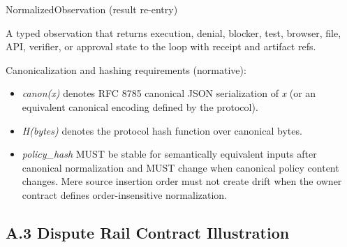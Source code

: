 \documentclass[
  11pt,
]{article}
\begin{document}
NormalizedObservation (result re-entry)

A typed observation that returns execution, denial, blocker, test, browser,
file, API, verifier, or approval state to the loop with receipt and artifact
refs.


\begin{center}
\end{center}


Canonicalization and hashing requirements (normative):

\begin{itemize}
\item
  \emph{canon(x)} denotes RFC 8785 canonical JSON serialization of
  \emph{x} (or an equivalent canonical encoding defined by the
  protocol).
\item
  \emph{H(bytes)} denotes the protocol hash function over canonical
  bytes.
\item
  \emph{policy\_hash} MUST be stable for semantically equivalent inputs
  after canonical normalization and MUST change when canonical policy
  content changes. Mere source insertion order must not create drift when
  the owner contract defines order-insensitive normalization.
\end{itemize}

\hypertarget{a.3-canonical-dispute-schema}{%
\subsection{A.3 Dispute Rail Contract
Illustration}\label{a.3-canonical-dispute-schema}}
\end{document}
